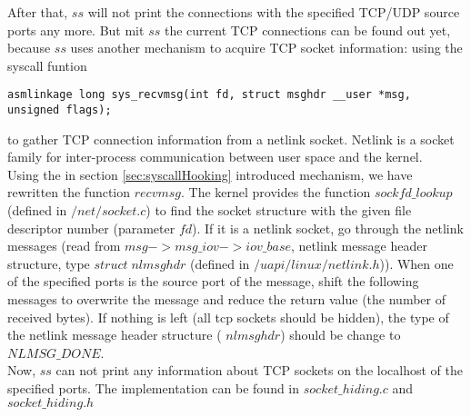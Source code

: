 After that, $ss$ will not print the connections with the specified TCP/UDP source ports any more. But mit $ss$ the current TCP connections can be found out yet, because $ss$ uses another mechanism to acquire TCP socket information: using the syscall funtion 
\begin{center}
\lstset{escapechar=,style=customc}
\begin{lstlisting}
asmlinkage long sys_recvmsg(int fd, struct msghdr __user *msg, unsigned flags);
\end{lstlisting}
\end{center}
to gather TCP connection information from a netlink socket. Netlink is a socket family for inter-process communication between user space and the kernel.\\
Using the in section \ref{sec:syscallHooking} introduced mechanism, we have rewritten the function $recvmsg$. The kernel provides the function $sockfd\_lookup$ (defined in $/net/socket.c$) to find the socket structure with the given file descriptor number (parameter $fd$). If it is a netlink socket, go through the netlink messages (read from $msg->msg\_iov->iov\_base$, netlink message header structure, type $struct \; nlmsghdr$ (defined in $/uapi/linux/netlink.h$)). When one of the specified ports is the source port of the message, shift the following messages to overwrite the message and reduce the return value (the number of received bytes). If nothing is left (all tcp sockets should be hidden), the type of the netlink message header structure ( $nlmsghdr$) should be change to $NLMSG\_DONE$. \\
Now, $ss$ can not print any information about TCP sockets on the localhost of the specified ports. The implementation can be found in $socket\_hiding.c$ and $socket\_hiding.h$\\

